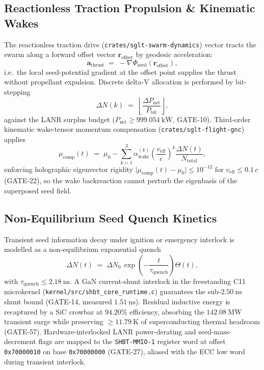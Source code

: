 \documentclass[10pt,twocolumn]{IEEEtran}
\begin{document}
\subsection{Reactionless Traction Propulsion \& Kinematic Wakes}
\label{sec:traction_wakes}

The reactionless traction drive (\texttt{crates/sglt-swarm-dynamics}) vector
tracts the swarm along a forward offset vector $\mathbf{r}_{\text{offset}}$
by geodesic acceleration:
\begin{equation}
\mathbf{a}_{\text{thrust}} \;=\; -\nabla \Phi_{\text{seed}}\!\left(\mathbf{r}_{\text{offset}}\right),
\end{equation}
i.e.\ the local seed-potential gradient at the offset point supplies the
thrust without propellant expulsion.  Discrete delta-V allocation is
performed by bit-stepping
\begin{equation}
\Delta N(k) \;=\; \left\lfloor \frac{\Delta P_{\text{net}}}{P_{\text{bit}}} \right\rfloor,
\end{equation}
against the LANR surplus budget ($P_{\text{net}} \ge 999.054\ \mathrm{kW}$,
GATE-10).  Third-order kinematic wake-tensor momentum compensation
(\texttt{crates/sglt-flight-gnc}) applies
\begin{equation}
\mu_{\text{comp}}(t) \;=\; \mu_{0} - \sum_{k=1}^{3} \alpha_{\text{wake}}^{(k)}
\left(\frac{v_{\text{eff}}}{c}\right)^{k} \frac{\Delta N(t)}{N_{\text{total}}},
\end{equation}
enforcing holographic eigenvector rigidity
$\vert{}\mu_{\text{comp}}(t)-\mu_{0}\vert{} \le 10^{-12}$ for
$v_{\text{eff}} \le 0.1\,c$ (GATE-22), so the wake backreaction cannot
perturb the eigenbasis of the superposed seed field.

\subsection{Non-Equilibrium Seed Quench Kinetics}
\label{sec:quench_kinetics}

Transient seed information decay under ignition or emergency interlock is
modelled as a non-equilibrium exponential quench
\begin{equation}
\Delta N(t) \;=\; \Delta N_{0}\, \exp\!\left(-\frac{t}{\tau_{\text{quench}}}\right)\Theta(t),
\end{equation}
with $\tau_{\text{quench}} \le 2.18\ \mathrm{ns}$.  A GaN current-shunt
interlock in the freestanding C11 microkernel
(\texttt{kernel/src/shbt\_core\_runtime.c}) guarantees the sub-$2.50\
\mathrm{ns}$ shunt bound (GATE-14, measured $1.51\ \mathrm{ns}$).  Residual
inductive energy is recaptured by a SiC crowbar at $94.20\%$ efficiency,
absorbing the $142.08\ \mathrm{MW}$ transient surge while preserving
$\ge 11.79\ \mathrm{K}$ of superconducting thermal headroom (GATE-57).
Hardware-interlocked LANR power-derating and seed-mass-decrement flags are
mapped to the \texttt{SHBT-MMIO-1} register word at offset
\texttt{0x70000010} on base \texttt{0x70000000} (GATE-27), aliased with the
ECC low word during transient interlock.
\end{document}

